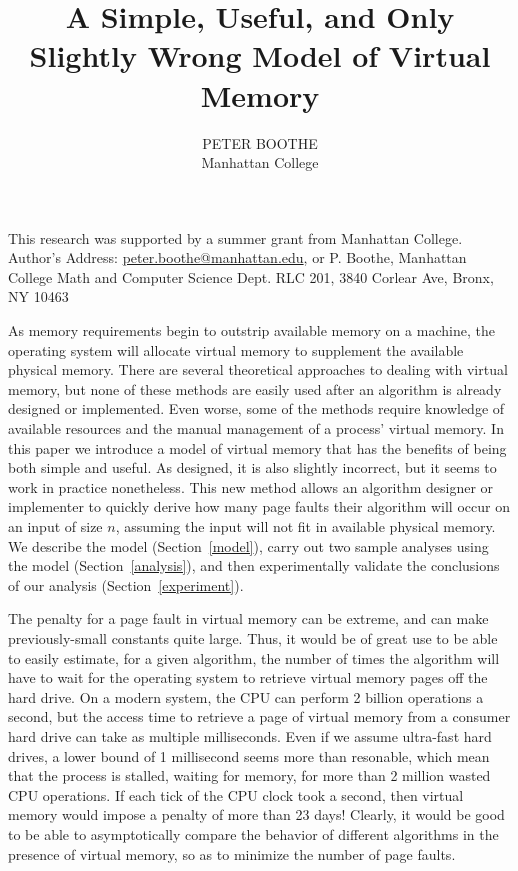 \documentclass{acmtrans2m}
\title{A Simple, Useful, and Only Slightly Wrong Model of Virtual Memory}
\author{PETER BOOTHE\\
Manhattan College
}
\begin{document}
 
\begin{bottomstuff} 
This research was supported by a summer grant from Manhattan College.\\
Author's Address: \url{peter.boothe@manhattan.edu}, or P. Boothe, Manhattan College Math and Computer Science Dept. RLC 201, 3840 Corlear Ave, Bronx, NY 10463
\end{bottomstuff} 
\maketitle 


As memory requirements begin to outstrip available memory on a machine, the
operating system will allocate virtual memory to supplement the available
physical memory.  There are several theoretical approaches to dealing with
virtual memory, but none of these methods are easily used after an algorithm is
already designed or implemented.  Even worse, some of the methods require
knowledge of available resources and the manual management of a process'
virtual memory.  In this paper we introduce a model of virtual memory that has
the benefits of being both simple and useful.  As designed, it is also slightly
incorrect, but it seems to work in practice nonetheless.  This new method
allows an algorithm designer or implementer to quickly derive how many page
faults their algorithm will occur on an input of size $n$, assuming the input
will not fit in available physical memory.  We describe the model
(Section~\ref{model}), carry out two sample analyses using the model
(Section~\ref{analysis}), and then experimentally validate the conclusions of
our analysis (Section~\ref{experiment}). 

The penalty for a page fault in virtual memory can be extreme, and can make
previously-small constants quite large. Thus, it would be of great use to be
able to easily estimate, for a given algorithm, the number of times the
algorithm will have to wait for the operating system to retrieve virtual memory
pages off the hard drive.  On a modern system, the CPU can perform 2 billion
operations a second, but the access time to retrieve a page of virtual memory
from a consumer hard drive can take as multiple milliseconds.  Even if we
assume ultra-fast hard drives, a lower bound of 1 millisecond seems more than
resonable, which mean that the process is stalled, waiting for memory, for more
than 2 million wasted CPU operations.  If each tick of the CPU clock took a
second, then virtual memory would impose a penalty of more than 23 days!
Clearly, it would be good to be able to asymptotically compare the behavior of
different algorithms in the presence of virtual memory, so as to minimize the
number of page faults.
\end{document}
